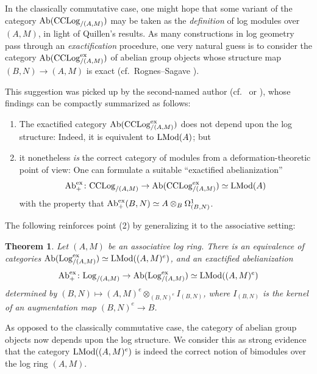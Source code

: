 \documentclass[a4paper,10pt%
]{amsart}
\numberwithin{equation}{section}
\newtheorem{theorem}[subsection]{Theorem}
\theoremstyle{definition}
\renewcommand{\:}{\colon}
\begin{document}
In the classically commutative case, one might hope that some variant of the category ${\rm Ab}({\rm CCLog}_{/(A, M)})$ may be taken as the \emph{definition} of log modules over $(A, M)$, in light of Quillen's results. As many constructions in log geometry pass through an \emph{exactification} procedure, one very natural guess is to consider the category ${\rm Ab}({\rm CCLog}_{/(A, M)}^{\rm ex})$ of abelian group objects whose structure map $(B, N) \to (A, M)$ is exact (cf.\ Rognes--Sagave \cite[Remark 8.8]{Rog09}). 

This suggestion was picked up by the second-named author (cf.\ \cite[Chapter 5]{Lun22} or \cite[Section 2]{Lun25}), whose findings can be compactly summarized as follows: 

\begin{enumerate}
    \item The exactified category ${\rm Ab}({\rm CCLog}^{\rm ex}_{/(A, M)})$ does not depend upon the log structure: Indeed, it is equivalent to ${\rm LMod}(A)$; but
    \item it nonetheless \emph{is} the correct category of modules from a deformation-theoretic point of view: One can formulate a suitable ``exactified abelianization'' \[{\rm Ab}_+^{\rm ex} \colon {\rm CCLog}_{/(A, M)} \to {\rm Ab}({\rm CCLog}^{\rm ex}_{/(A, M)}) \simeq {\rm LMod}(A)\] with the property that ${\rm Ab}_+^{\rm ex}(B, N) \simeq A \otimes_B \Omega^1_{(B, N)}$.
\end{enumerate}

\noindent The following reinforces point (2) by generalizing it to the associative setting: 

\begin{theorem}\label{thm:abgrpob} Let $(A, M)$ be an associative log ring. There is an equivalence of categories ${\rm Ab}({\rm Log}^{\rm ex}_{/(A, M)}) \simeq {\rm LMod}((A, M)^e)$, and an exactified abelianization \[{\rm Ab}_+^{\rm ex} \colon {\rm Log}_{/(A, M)} \to {\rm Ab}({\rm Log}_{/(A, M)}^{\rm ex}) \simeq {\rm LMod}((A, M)^e)\] determined by $(B, N) \mapsto (A, M)^e \otimes_{(B, N)^e} I_{(B, N)}$, where $I_{(B, N)}$ is the kernel of an augmentation map $(B, N)^e \to B$.  
\end{theorem}

As opposed to the classically commutative case, the category of abelian group objects now depends upon the log structure. We consider this as strong evidence that the category ${\rm LMod}((A, M)^e)$ is indeed the correct notion of bimodules over the log ring $(A, M)$.
\end{document}
